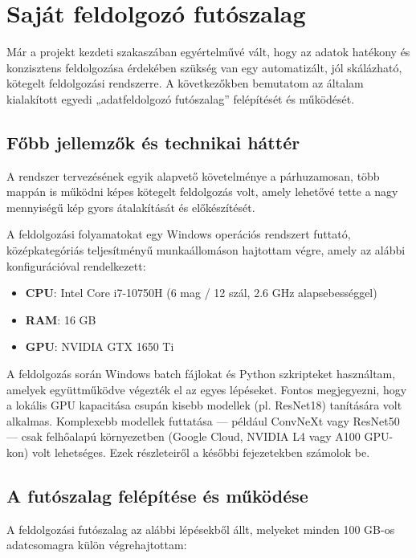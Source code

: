     \section{Saját feldolgozó futószalag}
        Már a projekt kezdeti szakaszában egyértelművé vált, hogy az adatok hatékony és konzisztens feldolgozása érdekében szükség van egy automatizált, jól skálázható, kötegelt feldolgozási rendszerre. A következőkben bemutatom az általam kialakított egyedi „adatfeldolgozó futószalag” felépítését és működését.

        \subsection{Főbb jellemzők és technikai háttér}
            A rendszer tervezésének egyik alapvető követelménye a párhuzamosan, több mappán is működni képes kötegelt feldolgozás volt, amely lehetővé tette a nagy mennyiségű kép gyors átalakítását és előkészítését.

            A feldolgozási folyamatokat egy Windows operációs rendszert futtató, középkategóriás teljesítményű munkaállomáson hajtottam végre, amely az alábbi konfigurációval rendelkezett:

            \begin{itemize}
                \item \textbf{CPU}: Intel Core i7-10750H (6 mag / 12 szál, 2.6 GHz alapsebességgel)
                \item \textbf{RAM}: 16 GB
                \item \textbf{GPU}: NVIDIA GTX 1650 Ti
            \end{itemize}

            A feldolgozás során Windows batch fájlokat és Python szkripteket használtam, amelyek együttműködve végezték el az egyes lépéseket. Fontos megjegyezni, hogy a lokális GPU kapacitása csupán kisebb modellek (pl. ResNet18) tanítására volt alkalmas. Komplexebb modellek futtatása — például ConvNeXt vagy ResNet50 — csak felhőalapú környezetben (Google Cloud, NVIDIA L4 vagy A100 GPU-kon) volt lehetséges. Ezek részleteiről a későbbi fejezetekben számolok be.

        \subsection{A futószalag felépítése és működése}
            A feldolgozási futószalag az alábbi lépésekből állt, melyeket minden 100 GB-os adatcsomagra külön végrehajtottam:

